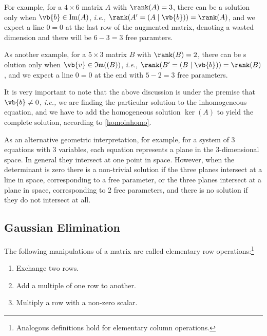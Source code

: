 \documentclass[a4paper,12pt]{report}
\begin{document}
For example, for a \(4 \times 6\) matrix \(A\) with \(\rank (A) = 3\), there can be a solution only when \(\vb{b} \in  \text{Im}(A) \), \textit{i.e.,} \(\rank (A' = (A \mid \vb{b} )) = \rank (A)\), and we expect a line \(0 = 0\) at the last row of the augmented matrix, denoting a wasted dimension and there will be \(6-3=3\) free paramters.     

As another example, for a \(5 \times 3\) matrix \(B\) with \(\rank (B) = 2\), there can be s olution only when \(\vb{v} \in \mathfrak{Im} ((B)) \), \textit{i.e.,} \(\rank (B' = (B \mid \vb{b} )) = \rank (B)\), and we expect a line \(0=0\) at the end with \(5-2 = 3\) free parameters.      

It is very important to note that the above discussion is under the premise that \(\vb{b} \neq 0\), \textit{i.e.,} we are finding the particular solution to the inhomogeneous equation, and we have to add the homogeneous solution \(\ker (A)\) to yield the complete solution, according to \cref{homoinhomo}.   

As an alternative geometric interpretation, for example, for a system of 3 equations with 3 variables, each equation represents a plane in the 3-dimensional space. In general they intersect at one point in space. However, when the determinant is zero there is a non-trivial solution if the three planes intersect at a line in space, corresponding to a free parameter, or the three planes intersect at a plane in space, corresponding to 2 free parameters, and there is no solution if they do not intersect at all.

\subsection{Gaussian Elimination} \label{elim} 

\begin{definition}
The following manipulations of a matrix are called elementary row operations:\footnote{Analogous definitions hold for elementary column operations.}

\begin{enumerate}[label=(\(I\)\arabic*)]
    \item Exchange two rows.
    \item Add a multiple of one row to another.
    \item Multiply a row with a non-zero scalar.
\end{enumerate}

\end{definition}
\end{document}
